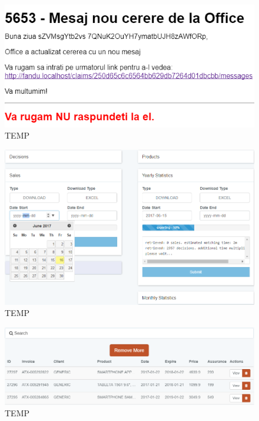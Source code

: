 	\begin{figure}
		\includegraphics[width=\linewidth]{../imagini/message_mail_from_office.png}
		\caption{TEMP}
		\label{fig:TEMP}
	\end{figure}
	\begin{figure}
		\includegraphics[width=\linewidth]{../imagini/reports.png}
		\caption{TEMP}
		\label{fig:TEMP}
	\end{figure}
	\begin{figure}
		\includegraphics[width=\linewidth]{../imagini/sales.png}
		\caption{TEMP}
		\label{fig:TEMP}
	\end{figure}
